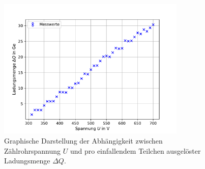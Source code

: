 \begin{figure}
  \centering
  \includegraphics[width = 0.8\textwidth]{../Messdaten/plots/ladung.pdf}
  \caption{Graphische Darstellung der Abhängigkeit zwischen Zählrohrspannung $U$ und pro einfallendem Teilchen ausgelöster Ladungsmenge $\Delta Q$.}
  \label{fig: ladung}
\end{figure}
